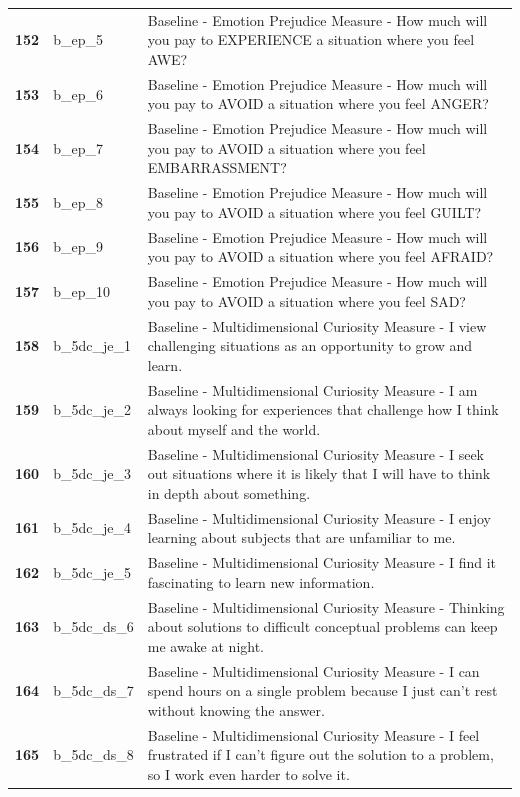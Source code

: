 \documentclass[
  letterpaper,
  DIV=11,
  numbers=noendperiod]{scrartcl}
\begin{document}
\begin{longtable}[t]{>{}cll}
\textbf{152} & b\_ep\_5 & Baseline - Emotion Prejudice Measure - How much will you pay to EXPERIENCE a situation where you feel AWE?\\
\textbf{153} & b\_ep\_6 & Baseline - Emotion Prejudice Measure - How much will you pay to AVOID a situation where you feel ANGER?\\
\textbf{154} & b\_ep\_7 & Baseline - Emotion Prejudice Measure - How much will you pay to AVOID a situation where you feel EMBARRASSMENT?\\
\textbf{155} & b\_ep\_8 & Baseline - Emotion Prejudice Measure - How much will you pay to AVOID a situation where you feel GUILT?\\
\addlinespace
\textbf{156} & b\_ep\_9 & Baseline - Emotion Prejudice Measure - How much will you pay to AVOID a situation where you feel AFRAID?\\
\textbf{157} & b\_ep\_10 & Baseline - Emotion Prejudice Measure - How much will you pay to AVOID a situation where you feel SAD?\\
\textbf{158} & b\_5dc\_je\_1 & Baseline - Multidimensional Curiosity Measure - I view challenging situations as an opportunity to grow and learn.\\
\textbf{159} & b\_5dc\_je\_2 & Baseline - Multidimensional Curiosity Measure - I am always looking for experiences that challenge how I think about myself and the world.\\
\textbf{160} & b\_5dc\_je\_3 & Baseline - Multidimensional Curiosity Measure - I seek out situations where it is likely that I will have to think in depth about something.\\
\addlinespace
\textbf{161} & b\_5dc\_je\_4 & Baseline - Multidimensional Curiosity Measure - I enjoy learning about subjects that are unfamiliar to me.\\
\textbf{162} & b\_5dc\_je\_5 & Baseline - Multidimensional Curiosity Measure - I find it fascinating to learn new information.\\
\textbf{163} & b\_5dc\_ds\_6 & Baseline - Multidimensional Curiosity Measure - Thinking about solutions to difficult conceptual problems can keep me awake at night.\\
\textbf{164} & b\_5dc\_ds\_7 & Baseline - Multidimensional Curiosity Measure - I can spend hours on a single problem because I just can't rest without knowing the answer.\\
\textbf{165} & b\_5dc\_ds\_8 & Baseline - Multidimensional Curiosity Measure - I feel frustrated if I can't figure out the solution to a problem, so I work even harder to solve it.\\

\end{longtable}
\end{document}
